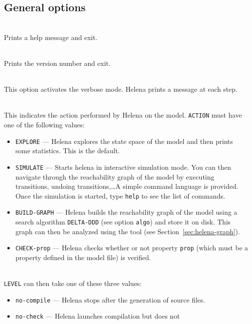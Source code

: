\subsection{General options}
\begin{description}
\item{}\\ Prints a help message and exit.
\item{}\\ Prints the version number and exit.
\item{}\\ This option activates the verbose
  mode.  Helena prints a message at each step.
\item{}\\
  This indicates the action performed by Helena on the model.
  \texttt{ACTION} must have one of the following values:
  \begin{itemize}
  \item\texttt{EXPLORE} --- Helena explores the state space of the
    model and then prints some statistics.  This is the default.
  \item\texttt{SIMULATE} --- Starts helena in interactive simulation
    mode.  You can then navigate through the reachability graph of the
    model by executing transitions, undoing transitions,\ldots A
    simple command language is provided.  Once the simulation is
    started, type \texttt{help} to see the list of commands.
  \item\texttt{BUILD-GRAPH} --- Helena builds the reachability graph
    of the model using a search algorithm \texttt{DELTA-DDD} (see
    option \texttt{algo}) and store it on disk.  This graph can then
    be analyzed using the  tool (see
    Section~\ref{sec:helena-graph}).
  \item\texttt{CHECK-prop} --- Helena checks whether or not property
    \texttt{prop} (which must be a property defined in the model file)
    is verified.
  \end{itemize}
\item{}\\ \texttt{LEVEL} can then take
  one of these three values:
  \begin{itemize}
  \item \texttt{no-compile} --- Helena stops after the generation of
    source files.
  \item \texttt{no-check} --- Helena launches compilation but does not

\end{itemize}
\end{description}
